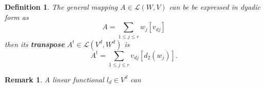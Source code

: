 \documentclass[aps,preprint]{revtex4}
\newtheorem{definition}[theorem]{Definition}
\newtheorem{remark}[theorem]{Remark}
\begin{document}
\begin{definition}
\label{General Transpose Definition in Dyadic Form} The general mapping $%
A\in \mathcal{L}\left( W,V\right) $ can be be expressed in dyadic form as 
\begin{equation}
A=\sum_{1\leq j\leq r}w_{j}\left[ v_{dj}\right]
\end{equation}%
then its \textbf{transpose} $A^{t}\in \mathcal{L}\left( V^{d},W^{d}\right) $
is%
\begin{equation}
A^{t}=\sum_{1\leq j\leq r}v_{dj}\left[ d_{2}\left( w_{j}\right) \right] .
\end{equation}
\end{definition}

\begin{remark}
A linear functional $l_{d}\in V^{d}$ can


\end{remark}
\end{document}
